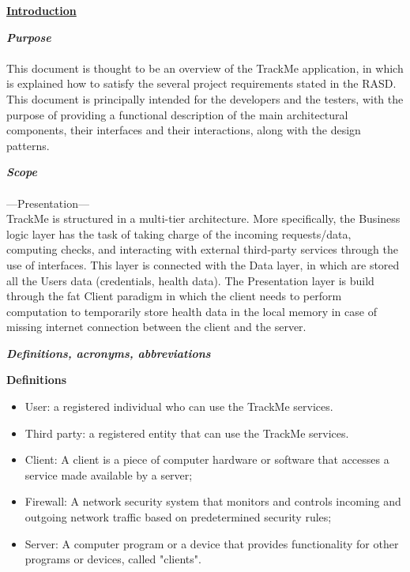 	\underline{\textbf{Introduction} }
	\begin{legal}
    		\item \textit{\textbf{Purpose}}\\\\
		This document is thought to be an overview of the TrackMe application, in which is explained how to satisfy the several project requirements stated in the RASD. This document is principally intended for the developers and the testers, with the purpose of providing a functional description of the main architectural components, their interfaces and their interactions, along with the design patterns.\\
		\item \textit{\textbf{Scope}}\\\\
		---Presentation---\\ 
		TrackMe is structured in a multi-tier architecture. More specifically, the Business logic layer has the task of taking charge of the incoming requests/data, computing checks, and interacting with external third-party services through the use of interfaces. This layer is connected with the Data layer, in which are stored all the Users data (credentials, health data). The Presentation layer is build through the fat Client paradigm in which the client needs to perform computation to temporarily store health data in the local memory in case of missing internet connection between the client and the server.\\
		\item \textit{\textbf{Definitions, acronyms, abbreviations}}\\
			\begin{legal}
				\item \textbf{Definitions}\\
				\begin{itemize}
					\item User: a registered individual who can use the TrackMe services.
					\item Third party: a registered entity that can use the TrackMe services.
					\item Client: A client is a piece of computer hardware or software that accesses a service made available by a server;
					\item Firewall: A network security system that monitors and controls incoming and outgoing network traffic based on predetermined security rules;
					\item Server: A computer program or a device that provides functionality for other programs or devices, called "clients".\\

\end{itemize}
\end{legal}
\end{legal}
